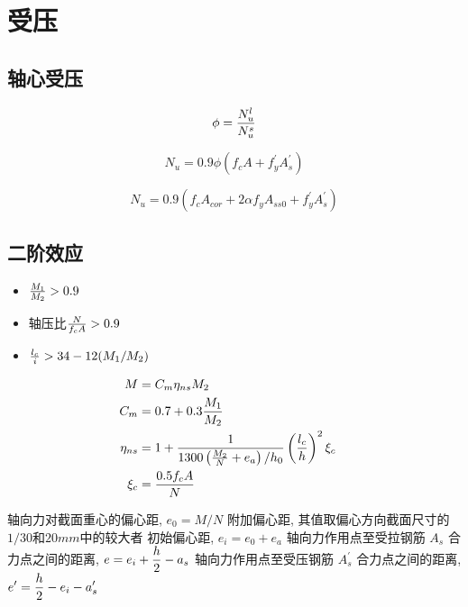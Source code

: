 
\section{受压}
\subsection{轴心受压}
\begin{equation}
    \phi = {N_u^l\over N_u^s}
\end{equation}

\begin{equation}
    N_u = 0.9\phi(f_cA+f^{\prime}_yA^{\prime}_s)
\end{equation}

\begin{equation}
    N_u = 0.9(f_cA_{cor} + 2\alpha f_yA_{ss0} + f^{\prime}_yA^{\prime}_s)
\end{equation}

\subsection{二阶效应}
\begin{itemize}
    \item ${M_1\over M_2} > 0.9$
    \item 轴压比${N\over f_cA} > 0.9$
    \item ${l_c\over i} > 34 - 12(M_1/M_2)$
\end{itemize}

\begin{align}
    M &= C_m\eta_{ns}M_2\cr
    C_m &= 0.7 + 0.3{M_1\over M_2}\cr
    \eta_{ns} &= 1 + {1\over{1300\left({M_2\over N} + e_a\right)/h_0}}\left({l_c\over h}\right)^2\xi_c\cr
    \xi_c &= {0.5f_cA\over N}
\end{align}

\begin{descff}
轴向力对截面重心的偏心距, $\displaystyle e_0 = M/N$
附加偏心距, 其值取偏心方向截面尺寸的$1/30$和$20mm$中的较大者
初始偏心距, $\displaystyle e_i = e_0 + e_a$
轴向力作用点至受拉钢筋 $A_s$ 合力点之间的距离, %
    $\displaystyle e = e_i + {h\over 2} - a_s$
轴向力作用点至受压钢筋 $A_s^\prime$ 合力点之间的距离, %
    $\displaystyle e^\prime = {h\over 2} - e_i - a_s^\prime$
\end{descff}\bigskip

